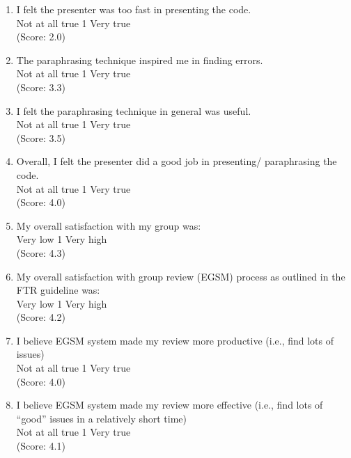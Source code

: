\begin{enumerate}
\item I felt the presenter was too fast in presenting the code.
\\
Not at all true \hfill 1     \hfill Very true\\
(Score: 2.0)

\item The paraphrasing technique inspired me in finding errors.
\\
Not at all true \hfill 1     \hfill Very true\\
(Score: 3.3)

\item I felt the paraphrasing technique in general was useful.
\\
Not at all true \hfill 1     \hfill Very true\\
(Score: 3.5)

\item Overall, I felt the presenter did a good job in presenting/
paraphrasing the code.
\\
Not at all true \hfill 1     \hfill Very true\\
(Score: 4.0)

\item My overall satisfaction with my group was:
\\
Very low \hfill 1     \hfill Very high\\
(Score: 4.3)

\item My overall satisfaction with group review (EGSM) process as
outlined in the FTR guideline was:
\\
Very low \hfill 1     \hfill Very high\\
(Score: 4.2)

\item I believe EGSM system made my review more productive (i.e., find
lots of issues) 
\\
Not at all true \hfill 1     \hfill Very true\\
(Score: 4.0)

\item I believe EGSM system made my review more effective
(i.e., find lots of ``good'' issues in a relatively short time)
\\
Not at all true \hfill 1     \hfill Very true\\
(Score: 4.1)


\end{enumerate}

